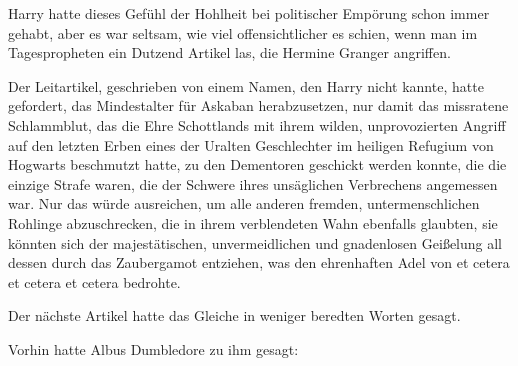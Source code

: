 Harry hatte dieses Gefühl der Hohlheit bei politischer Empörung schon immer gehabt, aber es war seltsam, wie viel offensichtlicher es schien, wenn man im Tagespropheten ein Dutzend Artikel las, die Hermine Granger angriffen.

Der Leitartikel, geschrieben von einem Namen, den Harry nicht kannte, hatte gefordert, das Mindestalter für Askaban herabzusetzen, nur damit das missratene Schlammblut, das die Ehre Schottlands mit ihrem wilden, unprovozierten Angriff auf den letzten Erben eines der Uralten Geschlechter im heiligen Refugium von Hogwarts beschmutzt hatte, zu den Dementoren geschickt werden konnte, die die einzige Strafe waren, die der Schwere ihres unsäglichen Verbrechens angemessen war. Nur das würde ausreichen, um alle anderen fremden, untermenschlichen Rohlinge abzuschrecken, die in ihrem verblendeten Wahn ebenfalls glaubten, sie könnten sich der majestätischen, unvermeidlichen und gnadenlosen Geißelung all dessen durch das Zaubergamot entziehen, was den ehrenhaften Adel von et cetera et cetera et cetera bedrohte.

Der nächste Artikel hatte das Gleiche in weniger beredten Worten gesagt.

Vorhin hatte Albus Dumbledore zu ihm gesagt:

